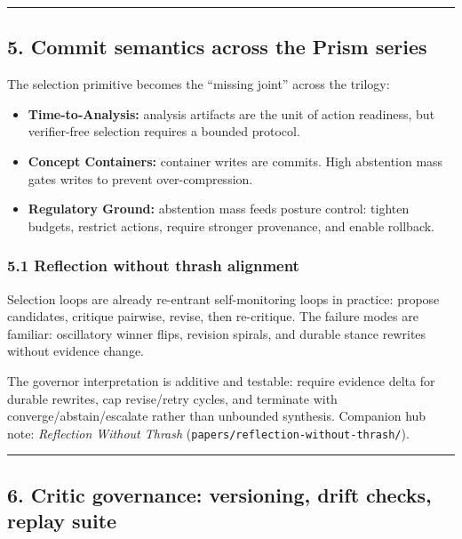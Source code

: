 \documentclass[11pt]{article}
\providecommand{\tightlist}{%
  \setlength{\itemsep}{0pt}\setlength{\parskip}{0pt}}
\begin{document}
\begin{center}\rule{0.5\linewidth}{0.5pt}\end{center}

\hypertarget{commit-semantics}{%
\subsection{5. Commit semantics across the Prism series}\label{commit-semantics}}

The selection primitive becomes the ``missing joint'' across the trilogy:

\begin{itemize}
\tightlist
\item \textbf{Time-to-Analysis:} analysis artifacts are the unit of action readiness, but verifier-free selection requires a bounded protocol.
\item \textbf{Concept Containers:} container writes are commits. High abstention mass gates writes to prevent over-compression.
\item \textbf{Regulatory Ground:} abstention mass feeds posture control: tighten budgets, restrict actions, require stronger provenance, and enable rollback.
\end{itemize}

\subsubsection{5.1 Reflection without thrash alignment}
Selection loops are already re-entrant self-monitoring loops in practice: propose candidates, critique pairwise, revise, then re-critique. The failure modes are familiar: oscillatory winner flips, revision spirals, and durable stance rewrites without evidence change.

The governor interpretation is additive and testable: require evidence delta for durable rewrites, cap revise/retry cycles, and terminate with converge/abstain/escalate rather than unbounded synthesis. Companion hub note: \emph{Reflection Without Thrash} (\texttt{papers/reflection-without-thrash/}).

\begin{center}\rule{0.5\linewidth}{0.5pt}\end{center}

\hypertarget{critic-governance}{%
\subsection{6. Critic governance: versioning, drift checks, replay suite}\label{critic-governance}}
\end{document}
